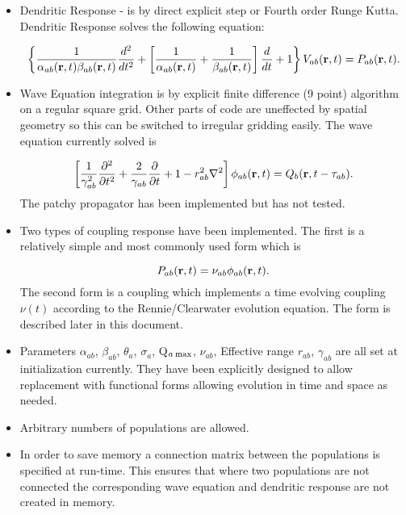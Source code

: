 \documentclass[12pt,a4paper]{article}
\begin{document}
\begin{itemize}
\item Dendritic Response - is by direct explicit step or Fourth order Runge Kutta.
Dendritic Response solves the following equation:

\begin{equation}
\left\{ \frac{1}{\alpha_{ab}({\bf r},t)\beta_{ab}({\bf r}, t)} \frac{d^2}{dt^2} +
  \left[ \frac{1}{\alpha_{ab}({\bf r}, t)}+ \frac{1}{\beta_{ab}({\bf r}, t)} 
  \right]
  \frac{d}{dt} + 1
\right\}
V_{ab}({\bf r}, t) = P_{ab}({\bf r}, t).
\end{equation}

\item Wave Equation integration is by explicit finite difference (9 point) algorithm
   on a regular square grid. Other parts of code are uneffected by spatial
   geometry so this can be switched to irregular gridding easily. The wave equation
   currently solved is 

\begin{equation}
\left[\frac{1}{\gamma_{ab}^2}\frac{\partial^2}{\partial t^2}+\frac{2}{\gamma_{ab}}\frac{\partial}
{\partial t}+1-r_{ab}^2\nabla^2 \right] \phi_{ab}({\bf r},t)
=Q_b({\bf r},t-\tau_{ab}).
\end{equation}
The patchy propagator has been implemented but has not tested.

\item Two types of coupling response have been implemented.
The first is a relatively simple and most commonly used form which is

\begin{equation}
P_{ab}({\bf r}, t) = \nu_{ab} \phi_{ab}({\bf r}, t).
\label{eq:simplecoupling}
\end{equation}
The second form is a coupling which implements a time evolving coupling $\nu(t)$
according to the Rennie/Clearwater evolution equation. The form is described later
in this document.

\item Parameters $\alpha_{ab}$, $\beta_{ab}$, $\theta_{a}$, $\sigma_{a}$, Q$_{a \: \rm{max}}$,
  $\nu_{ab}$, Effective range $r_{ab}$, $\gamma_{ab}$
  are all set at initialization currently. They have been explicitly
  designed to allow replacement with functional forms allowing evolution
  in time and space as needed.
  
\item Arbitrary numbers of populations are allowed.

\item In order to save memory a connection matrix between the populations is
   specified at run-time. This ensures that where two populations are not
   connected the corresponding wave equation and dendritic response are
   not created in memory.


\end{itemize}
\end{document}
